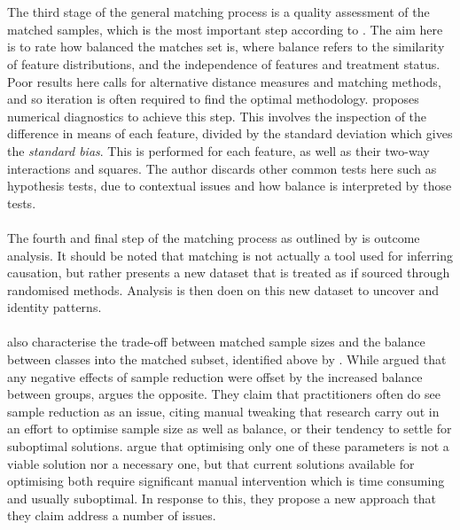 {{\\\\
The third stage of the general matching process is a quality assessment of the matched samples, which is the most important step according to \cite{stuart2010matching}. The aim here is to rate how balanced the matches set is, where balance refers to the similarity of feature distributions, and the independence of features and treatment status. Poor results here calls for alternative distance measures and matching methods, and so iteration is often required to find the optimal methodology. \cite{stuart2010matching} proposes numerical diagnostics to achieve this step. This involves the inspection of the difference in means of each feature, divided by the standard deviation which gives the {\it standard bias}. This is performed for each feature, as well as their two-way interactions and squares. The author discards other common tests here such as hypothesis tests, due to contextual issues and how balance is interpreted by those tests. 
 \\\\ 
The fourth and final step of the matching process as outlined by \cite{stuart2010matching} is outcome analysis. It should be noted that matching is not actually a tool used for inferring causation, but rather presents a new dataset that is treated as if sourced through randomised methods. Analysis is then doen on this new dataset to uncover and identity patterns.   
\\\\
\cite{king2014balance} also characterise the trade-off between matched sample sizes and the balance between classes into the matched subset, identified above by \cite{stuart2010matching}. While \cite{stuart2010matching} argued that any negative effects of sample reduction were offset by the increased balance between groups, \cite{king2014balance} argues the opposite. They claim that practitioners often do see sample reduction as an issue, citing manual tweaking that research carry out in an effort to optimise sample size as well as balance, or their tendency to settle for suboptimal solutions. \cite{king2014balance} argue that optimising only one of these parameters is not a viable solution nor a necessary one, but that current solutions available for optimising both require significant manual intervention which is time consuming and usually suboptimal. In response to this, they propose a new approach that they claim address a number of issues. \\\\
}}
